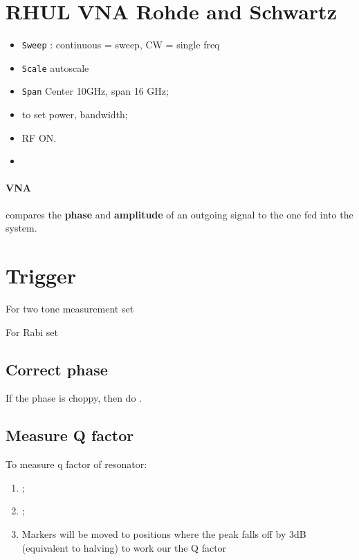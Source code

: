 
\section{RHUL VNA Rohde and Schwartz}
\begin{itemize}
\item \texttt{Sweep} \ra {}: continuous = sweep, CW = single freq
\item \texttt{Scale} \ra autoscale
\item \texttt{Span} \ra Center 10GHz, span 16 GHz;
\item {} to set power, bandwidth;
\item RF ON.
\item {}
\end{itemize}
 
\paragraph{VNA} compares  the \textbf{phase} and  \textbf{amplitude} of an outgoing  signal to
the one fed into the system.
 
 \begin{figure}[h]
 \end{figure}

 \section{Trigger}
 \label{sec:trigger}

 For two tone measurement set 

 For Rabi set 
 
 \subsection{Correct phase}
 \label{sec:correct-phase}

 If the phase is choppy, then do .

 \subsection{Measure Q factor}
 \label{sec:measure-q-factor}

 To measure q factor of resonator:
 \begin{enumerate}
 \item {};
 \item {} ;
 \item Markers  will be  moved to positions  where the  peak falls off  by 3dB  (equivalent to
   halving) to work our the Q factor
 \end{enumerate}
 \newpage
 